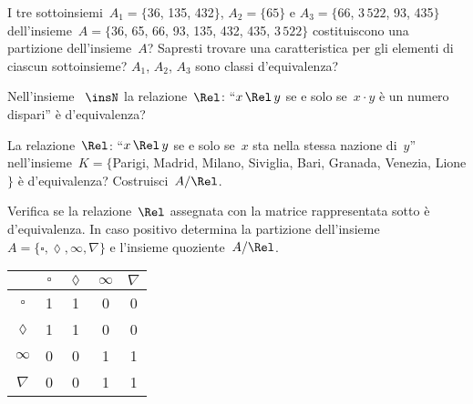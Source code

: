\begin{multicols}{2}

\begin{esercizio}
\label{ese:B.54}
I tre sottoinsiemi~$A_1 = \{$36, 135, 432$\}$, $A_2 = \{65\}$ e $A_3 = \{$66, $3\,522$, 93, 435$\}$ dell'insieme~$A = \{$36, 65, 66, 93, 135, 432, 435, $3\,522\}$ costituiscono una partizione dell'insieme~$A$? Sapresti trovare una caratteristica per gli elementi di ciascun sottoinsieme? $A_1$, $A_2$, $A_3$ sono classi d'equivalenza?
\end{esercizio}

\begin{esercizio}
\label{ese:B.55}
Nell'insieme ~$\insN$ la relazione~$\Rel$: ``$x \,\Rel\, y$ se e solo se~$x \cdot y$ è un numero dispari'' è d'equivalenza?
\end{esercizio}

\begin{esercizio}
\label{ese:B.56}
La relazione~$\Rel$: ``$x \,\Rel\, y$ se e solo se~$x$ sta nella stessa nazione di~$y$'' nell'insieme~$K= \{$Parigi, Madrid, Milano, Siviglia, Bari, Granada, Venezia, Lione$\}$
è d'equivalenza? Costruisci~$A/\Rel$.
\end{esercizio}

\begin{esercizio}
\label{ese:B.57}
Verifica se la relazione~$\Rel$ assegnata con la matrice rappresentata
sotto è d'equivalenza. In caso positivo determina la partizione dell'insieme~$A =\{\square, \lozenge, \infty, \nabla\}$ e l'insieme
quoziente~$A/\Rel$.

\begin{center}
\begin{tabular}{ccccc}
\toprule
 & $\square$ & $\lozenge$ & $\infty$ & $\nabla$\\
\midrule
 $\square$ & 1 & 1 & 0 & 0 \\
 $\lozenge$ & 1 & 1 & 0 & 0 \\
 $\infty$ & 0 & 0 & 1 & 1\\
 $\nabla$ & 0 & 0 & 1 & 1\\
\bottomrule
\end{tabular}
\end{center}
\end{esercizio}


\end{multicols}
